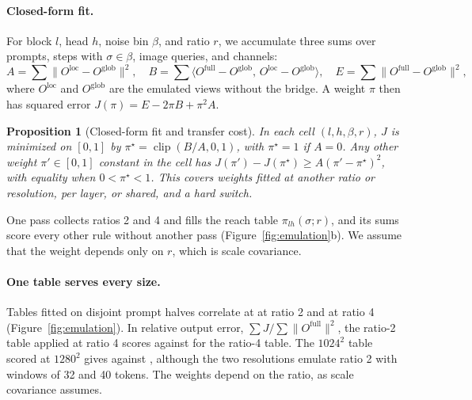 \documentclass{article} %
\newcommand{\Oloc}{O^{\mathrm{loc}}}
\newcommand{\Oglob}{O^{\mathrm{glob}}}
\newcommand{\Ofull}{O^{\mathrm{full}}}
\newcommand{\clip}{\operatorname{clip}}
\newtheorem{proposition}{Proposition}
\theoremstyle{remark}
\begin{document}
\paragraph{Closed-form fit.} For block $l$, head $h$, noise bin $\beta$, and ratio $r$, we accumulate three sums over prompts, steps with $\sigma\in\beta$, image queries, and channels:
\begin{equation}
  A=\textstyle\sum\|\Oloc-\Oglob\|^2,\quad
  B=\sum\langle \Ofull-\Oglob,\,\Oloc-\Oglob\rangle,\quad
  E=\sum\|\Ofull-\Oglob\|^2,
  \label{eq:stats}
\end{equation}
where $\Oloc$ and $\Oglob$ are the emulated views without the bridge. A weight $\pi$ then has squared error $J(\pi)=E-2\pi B+\pi^2A$.

\begin{proposition}[Closed-form fit and transfer cost]
\label{prop:opt}
In each cell $(l,h,\beta,r)$, $J$ is minimized on $[0,1]$ by $\pi^\star=\clip(B/A,0,1)$, with $\pi^\star=1$ if $A=0$. Any other weight $\pi'\in[0,1]$ constant in the cell has $J(\pi')-J(\pi^\star)\ge A(\pi'-\pi^\star)^2$, with equality when $0<\pi^\star<1$. This covers weights fitted at another ratio or resolution, per layer, or shared, and a hard switch.
\end{proposition}
One pass collects ratios 2 and 4 and fills the reach table $\pi_{lh}(\sigma;r)$, and its sums score every other rule without another pass (Figure~\ref{fig:emulation}b). We assume that the weight depends only on $r$, which is scale covariance.

\paragraph{One table serves every size.} Tables fitted on disjoint prompt halves correlate at \hlEmuSplitHalfTwo{} at ratio 2 and \hlEmuSplitHalfFour{} at ratio 4 (Figure~\ref{fig:emulation}). In relative output error, $\sum J/\sum\|\Ofull\|^2$, the ratio-2 table applied at ratio 4 scores \hlEmuXferRatio{} against \hlEmuErrHeadFour{} for the ratio-4 table. The $1024^2$ table scored at $1280^2$ gives \hlEmuXferRes{} against \hlEmuOwnRes, although the two resolutions emulate ratio 2 with windows of 32 and 40 tokens. The weights depend on the ratio, as scale covariance assumes.
\end{document}
